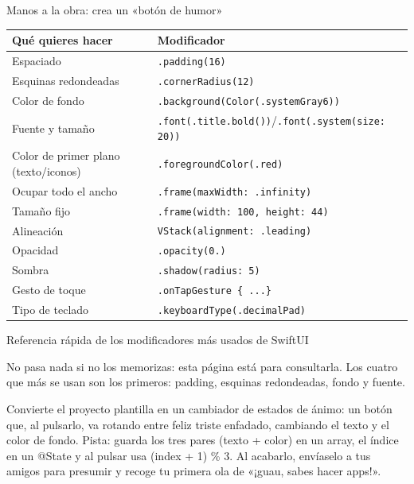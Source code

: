\begin{tcbpractice}{Manos a la obra: crea un «botón de humor»}

\begin{center}
\begin{tabularx}{\linewidth}{|X|X|}
\hline
\textbf{Qué quieres hacer} & \textbf{Modificador} \tabularnewline
\hline
Espaciado & \texttt{.\allowbreak padding(16)} \tabularnewline
Esquinas redondeadas & \texttt{.\allowbreak cornerRadius(12)} \tabularnewline
Color de fondo & \texttt{.\allowbreak background(Color(.\allowbreak systemGray6))} \tabularnewline
Fuente y tamaño & \texttt{.\allowbreak font(.\allowbreak title.\allowbreak bold())}/\texttt{.\allowbreak font(.\allowbreak system(size: 20))} \tabularnewline
Color de primer plano (texto/iconos) & \texttt{.\allowbreak foregroundColor(.\allowbreak red)} \tabularnewline
Ocupar todo el ancho & \texttt{.\allowbreak frame(maxWidth: .\allowbreak infinity)} \tabularnewline
Tamaño fijo & \texttt{.\allowbreak frame(width: 100, height: 44)} \tabularnewline
Alineación & \texttt{VStack(alignment: .\allowbreak leading)} \tabularnewline
Opacidad & \texttt{.\allowbreak opacity(0.\allowbreak 6)} \tabularnewline
Sombra & \texttt{.\allowbreak shadow(radius: 5)} \tabularnewline
Gesto de toque & \texttt{.\allowbreak onTapGesture \{ .\allowbreak .\allowbreak .\allowbreak  \}} \tabularnewline
Tipo de teclado & \texttt{.\allowbreak keyboardType(.\allowbreak decimalPad)} \tabularnewline
\hline
\end{tabularx}
\end{center}

\begin{center}\small\color{gray}Referencia rápida de los modificadores más usados de SwiftUI\end{center}

No pasa nada si no los memorizas: esta página está para consultarla. Los cuatro que más se usan son los primeros: padding, esquinas redondeadas, fondo y fuente.

Convierte el proyecto plantilla en un cambiador de estados de ánimo: un botón que, al pulsarlo, va rotando entre feliz triste enfadado, cambiando el texto y el color de fondo. Pista: guarda los tres pares (texto + color) en un array, el índice en un @State y al pulsar usa (index + 1) \% 3. Al acabarlo, envíaselo a tus amigos para presumir y recoge tu primera ola de «¡guau, sabes hacer apps!».

\end{tcbpractice}

